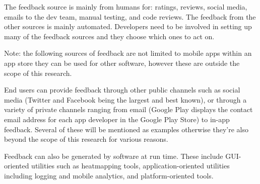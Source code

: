 The feedback source is mainly from humans for: ratings, reviews, social media, emails to the dev team, manual testing, and code reviews. The feedback from the other sources is mainly automated. Developers need to be involved in setting up many of the feedback sources and they choose which ones to act on.

Note: the following sources of feedback are not limited to mobile apps within an app store they can be used for other software, however these are outside the scope of this research.

End users can provide feedback through other public channels such as social media (Twitter and Facebook being the largest and best known), or through a variety of private channels ranging from email (Google Play displays the contact email address for each app developer in the Google Play Store) to in-app feedback. Several of these will be mentioned as examples otherwise they're also beyond the scope of this research for various reasons. 

Feedback can also be generated by software at run time. These include GUI-oriented utilities such as heatmapping tools, application-oriented utilities including logging and mobile analytics, and platform-oriented tools.



